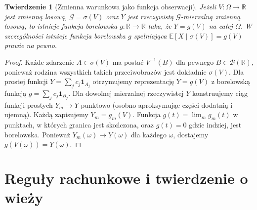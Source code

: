 \documentclass[11pt,a4paper,oneside]{report}
\numberwithin{equation}{chapter}
\theoremstyle{plain}
\newtheorem{twierdzenie}{Twierdzenie}[chapter]
\theoremstyle{definition}
\theoremstyle{remark}
\newcommand{\R}{\mathbb{R}}
\newcommand{\E}{\mathbb{E}}
\newcommand{\ind}[1]{\mathbf{1}_{#1}}
\begin{document}
\begin{twierdzenie}[Zmienna warunkowa jako funkcja obserwacji]
Jeżeli $V:\Omega\to\R$ jest zmienną losową,
$\mathcal G=\sigma(V)$ oraz $Y$ jest rzeczywistą
$\mathcal G$-mierzalną zmienną losową, to istnieje
funkcja borelowska $g:\R\to\R$ taka, że
$Y=g(V)$ na całej $\Omega$. W szczególności
istnieje funkcja borelowska $g$ spełniająca
$\E[X\mid\sigma(V)]=g(V)$ prawie na pewno.
\end{twierdzenie}
\begin{proof}
Każde zdarzenie $A\in\sigma(V)$ ma postać
$V^{-1}(B)$ dla pewnego $B\in\mathcal B(\R)$,
ponieważ rodzina wszystkich takich przeciwobrazów
jest dokładnie $\sigma(V)$. Dla prostej funkcji
$Y=\sum_j c_j\ind{A_j}$ otrzymujemy reprezentację
$Y=g(V)$ z borelowską funkcją
$g=\sum_j c_j\ind{B_j}$.
Dla dowolnej mierzalnej rzeczywistej $Y$
konstruujemy ciąg funkcji prostych $Y_m\to Y$
punktowo (osobno aproksymując części dodatnią
i ujemną). Każdą zapisujemy $Y_m=g_m(V)$.
Funkcja $g(t)=\lim_m g_m(t)$ w punktach, w których
granica jest skończona, oraz $g(t)=0$ gdzie indziej,
jest borelowska. Ponieważ $Y_m(\omega)\to Y(\omega)$
dla każdego $\omega$, dostajemy $g(V(\omega))=Y(\omega)$.
\end{proof}

\section{Reguły rachunkowe i twierdzenie o wieży}
\end{document}
